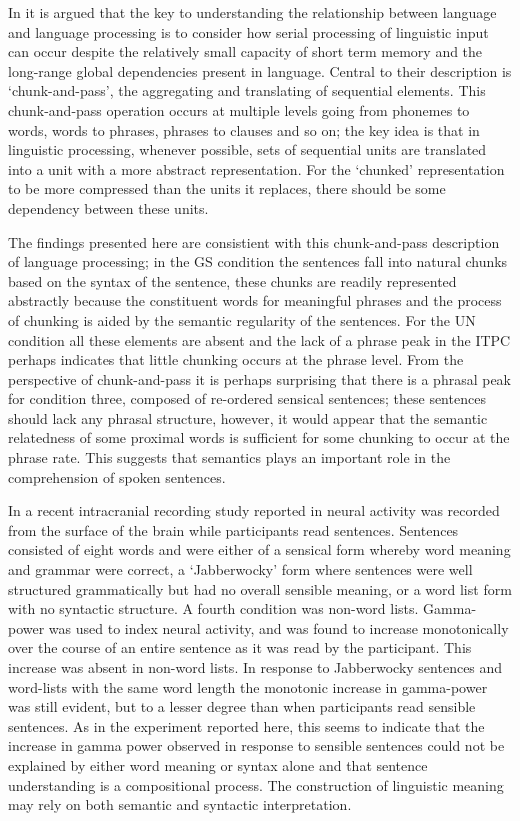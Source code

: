 \documentclass[a4paper,10pt,twoside]{article}
\begin{document}
In \cite{ChristiansenChater2016} it is argued that the key to
understanding the relationship between language and language
processing is to consider how serial processing of linguistic input
can occur despite the relatively small capacity of short term memory
and the long-range global dependencies present in language. Central to
their description is \lq{}chunk-and-pass\rq{}, the aggregating and
translating of sequential elements. This chunk-and-pass operation
occurs at multiple levels going from phonemes to words, words to
phrases, phrases to clauses and so on; the key idea is that in
linguistic processing, whenever possible, sets of sequential units are
translated into a unit with a more abstract representation. For the
\lq{}chunked\rq{} representation to be more compressed than the units
it replaces, there should be some dependency between these
units.

The findings presented here are consistient with this chunk-and-pass
description of language processing; in the GS condition the sentences
fall into natural chunks based on the syntax of the sentence, these
chunks are readily represented abstractly because the constituent
words for meaningful phrases and the process of chunking is aided by
the semantic regularity of the sentences. For the UN condition all these
elements are absent and the lack of a phrase peak in the ITPC perhaps
indicates that little chunking occurs at the phrase level. From the
perspective of chunk-and-pass it is perhaps surprising that there is a
phrasal peak for condition three, composed of re-ordered sensical
sentences; these sentences should lack any phrasal structure, however,
it would appear that the semantic relatedness of some proximal words
is sufficient for some chunking to occur at the phrase rate. This
suggests that semantics plays an important role in the comprehension of
spoken sentences.

In a recent intracranial recording study reported in
\cite{FedorenkoEtAl2016} neural activity was recorded from the surface
of the brain while participants read sentences. Sentences consisted of
eight words and were either of a sensical form whereby word meaning
and grammar were correct, a \lq{}Jabberwocky\rq{} form where sentences were
well structured grammatically but had no overall sensible meaning, or
a word list form with no syntactic structure. A fourth condition was
non-word lists. Gamma-power was used to index neural activity, and was
found to increase monotonically over the course of an entire sentence
as it was read by the participant. This increase was absent in
non-word lists. In response to Jabberwocky sentences and word-lists
with the same word length the monotonic increase in gamma-power was
still evident, but to a lesser degree than when participants read
sensible sentences. As in the experiment reported here, this seems to
indicate that the increase in gamma power observed in response to
sensible sentences could not be explained by either word meaning or
syntax alone and that sentence understanding is a compositional
process. The construction of linguistic meaning may rely on both
semantic and syntactic interpretation.
\end{document}

